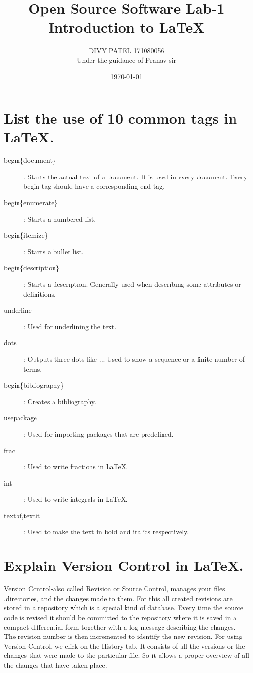 \documentclass[a4paper]{article}
\title{Open Source Software Lab-1\\Introduction to LaTeX}
\author{DIVY PATEL 171080056\\ Under the guidance of Pranav sir}
\date{\today}
\begin{document}
\maketitle

\section{List the use of 10 common tags in LaTeX.}
\label{sec:introduction}

\begin{description}
\item[begin\{document\}]: Starts the actual text of a document. It is used in every document. Every begin tag should have a corresponding end tag.
\item[begin\{enumerate\}]: Starts a numbered list.
\item[begin\{itemize\}]: Starts a bullet list. 
\item[begin\{description\}]: Starts a description. Generally used when describing some attributes or definitions.
\item [underline] : Used for underlining the text.
\item[dots]: Outputs three dots like ... Used to show a sequence or a finite number of terms.
\item[begin\{bibliography\}]: Creates a bibliography.
\item[usepackage]: Used for importing packages that are predefined.
\item[frac]: Used to write fractions in LaTeX.
\item[int]: Used to write integrals in LaTeX.
\item[textbf,textit]: Used to make the text in bold and italics respectively.
\end{description}

\section{Explain Version Control in LaTeX.}
\label{sec:theory}
Version Control-also called Revision or Source Control, manages your ﬁles ,directories, and the changes made to them. For this all created revisions are stored in a repository which is a special kind of database. Every time the source code is revised it should be committed to the repository where it is saved in a compact differential form together with a log message describing the changes. The revision number is then incremented to identify the new revision.
For using Version Control, we click on the History tab. It consists of all the versions or the changes that were made to the particular file. So it allows a proper overview of all the changes that have taken place.
\end{document}
